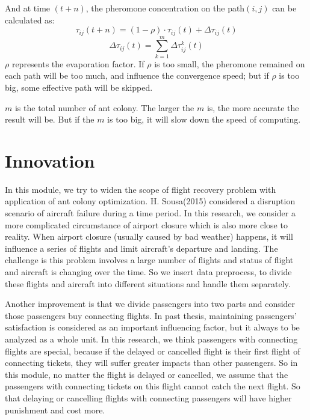 \documentclass[senior]{IPSstyle}
\begin{document}
\begin{enumerate}
    And at time \((t+n)\), the pheromone concentration on the path\((i,j)\) can be calculated as:
    \begin{equation}
        \tau _{ij}(t+n)=(1-\rho)\cdot \tau _{ij}(t)+\Delta\tau _{ij}(t)
    \end{equation}
    \begin{equation}
        \Delta\tau _{ij}(t) = \sum_{k=1}^m \Delta\tau _{ij}^k(t)
    \end{equation}
    \(\rho\) represents the evaporation factor. If \(\rho\) is too small, the pheromone remained on each path will be too much, and influence the convergence speed; but if \(\rho\) is too big, some effective path will be skipped. 
    
    \(m\) is the total number of ant colony. The larger the \(m\) is, the  more accurate the result will be. But if the \(m\) is too big, it will slow down the speed of computing.
\end{enumerate}

 


\section{Innovation} \label{innovation}
In this module, we try to widen the scope of flight recovery problem with application of ant colony optimization. H. Sousa(2015) considered a disruption scenario of aircraft failure during a time period. In this research, we consider a more complicated circumstance of airport closure which is also more close to reality. When airport closure (usually caused by bad weather) happens, it will influence a series of flights and limit aircraft’s departure and landing. The challenge is this problem involves a large number of flights and status of flight and aircraft is changing over the time. So we insert data preprocess, to divide these flights and aircraft into different situations and handle them separately. 

Another improvement is that we divide passengers into two parts and consider those passengers buy connecting flights. In past thesis, maintaining passengers’ satisfaction is considered as an important influencing factor, but it always to be analyzed as a whole unit. In this research, we think passengers with connecting flights are special, because if the delayed or cancelled flight is their first flight of connecting tickets, they will suffer greater impacts than other passengers. So in this module, no matter the flight is delayed or cancelled, we assume that the passengers with connecting tickets on this flight cannot catch the next flight. So that delaying or cancelling flights with connecting passengers will have higher punishment and cost more.
\end{document}
